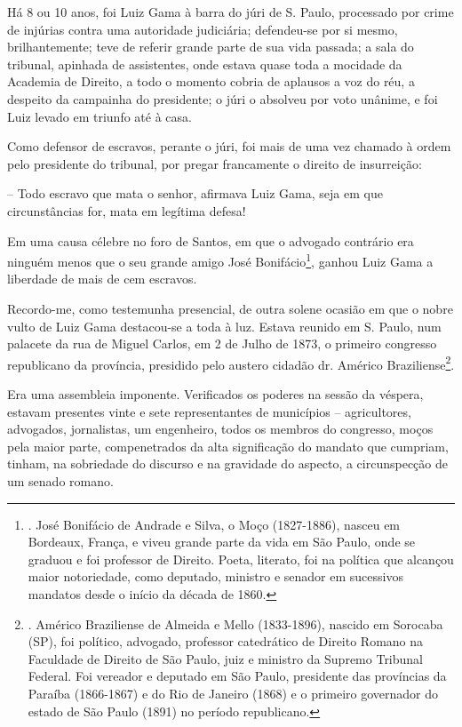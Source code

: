 Há 8 ou 10 anos, foi Luiz Gama à barra do júri de S. Paulo, processado
por crime de injúrias contra uma autoridade judiciária; defendeu-se por
si mesmo, brilhantemente; teve de referir grande parte de sua vida
passada; a sala do tribunal, apinhada de assistentes, onde estava quase
toda a mocidade da Academia de Direito, a todo o momento cobria de
aplausos a voz do réu, a despeito da campainha do presidente; o júri o
absolveu por voto unânime, e foi Luiz levado em triunfo até à casa.

Como defensor de escravos, perante o júri, foi mais de uma vez chamado à
ordem pelo presidente do tribunal, por pregar francamente o direito de
insurreição:

-- Todo escravo que mata o senhor, afirmava Luiz Gama, seja em que
circunstâncias for, mata em legítima defesa!

Em uma causa célebre no foro de Santos, em que o advogado contrário era
ninguém menos que o seu grande amigo José Bonifácio\footnote{. José
  Bonifácio de Andrade e Silva, o Moço (1827-1886), nasceu em Bordeaux,
  França, e viveu grande parte da vida em São Paulo, onde se graduou e
  foi professor de Direito. Poeta, literato, foi na política que
  alcançou maior notoriedade, como deputado, ministro e senador em
  sucessivos mandatos desde o início da década de 1860.}, ganhou Luiz
Gama a liberdade de mais de cem escravos.

Recordo-me, como testemunha presencial, de outra solene ocasião em que o
nobre vulto de Luiz Gama destacou-se a toda à luz. Estava reunido em S.
Paulo, num palacete da rua de Miguel Carlos, em 2 de Julho de 1873, o
primeiro congresso republicano da província, presidido pelo austero
cidadão dr. Américo Braziliense\footnote{. Américo Braziliense de
  Almeida e Mello (1833-1896), nascido em Sorocaba (SP), foi político,
  advogado, professor catedrático de Direito Romano na Faculdade de
  Direito de São Paulo, juiz e ministro da Supremo Tribunal Federal. Foi
  vereador e deputado em São Paulo, presidente das províncias da Paraíba
  (1866-1867) e do Rio de Janeiro (1868) e o primeiro governador do
  estado de São Paulo (1891) no período republicano.}.

Era uma assembleia imponente. Verificados os poderes na sessão da
véspera, estavam presentes vinte e sete representantes de municípios --
agricultores, advogados, jornalistas, um engenheiro, todos os membros do
congresso, moços pela maior parte, compenetrados da alta significação do
mandato que cumpriam, tinham, na sobriedade do discurso e na gravidade
do aspecto, a circunspecção de um senado romano.

